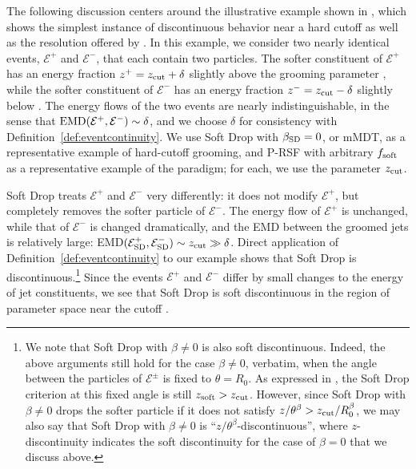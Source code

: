 The following discussion centers around the illustrative example shown in , which shows the simplest instance of discontinuous behavior near a hard cutoff as well as the resolution offered by \PIRANHA{}.
%
In this example, we consider two nearly identical events, \(\mathcal{E}^+\) and \(\mathcal{E}^-\), that each contain two particles.
%
The softer constituent of \(\mathcal E^+\) has an energy fraction \(z^+ =  z_{\rm cut} + \delta\) slightly above the grooming parameter \zcut, while the softer constituent of \(\mathcal E^-\) has an energy fraction \(z^- =z_{\rm cut} - \delta\) slightly below \zcut.
%
The energy flows of the two events are nearly indistinguishable, in the sense that \(
{\rm EMD}(\mathcal{E}^+, \mathcal{E}^-)\sim\delta
\),
and we choose \(\delta\) for consistency with Definition~\ref{def:eventcontinuity}.
%
We use Soft Drop with \(\beta_{\rm SD} = 0\), or mMDT, as a representative example of hard-cutoff grooming, and P-RSF with arbitrary \(f_{\rm soft}\) as a representative example of the \PIRANHA{} paradigm;
%
for each, we use the parameter \(z_{\rm cut}\).

Soft Drop treats \(\mathcal E^+\) and \(\mathcal E^-\) very differently:
%
it does not modify \(\mathcal E^+\), but completely removes the softer particle of \(\mathcal E^-\).
%
The energy flow of \(\mathcal E^+\) is unchanged, while that of \(\mathcal E^-\) is changed dramatically, and the EMD between the groomed jets is relatively large:
EMD\(
(\mathcal{E}^+_{\rm SD},
\mathcal{E}^-_{\rm SD})
\sim z_{\rm cut}
\gg \delta\).
%
Direct application of Definition~\ref{def:eventcontinuity} to our example shows that Soft Drop is discontinuous.\footnote{
We note that Soft Drop with \(\beta \neq 0\) is also soft discontinuous.
%
Indeed, the above arguments still hold for the case \(\beta \neq 0\), verbatim, when the angle between the particles of \(\mathcal E^\pm\) is fixed to \(\theta = R_0\).
%
As expressed in , the Soft Drop criterion at this fixed angle is still \(z_{\rm soft} > z_{\rm cut}\).
%
However, since Soft Drop with \(\beta \neq 0\) drops the softer particle if it does not satisfy \(z / \theta^{\beta} > z_{\rm cut}/ R_0^\beta\), we may also say that Soft Drop with \(\beta \neq 0\) is ``\(z / \theta^{\beta}\)-discontinuous'', where \(z\)-discontinuity indicates the soft discontinuity for the case of \(\beta = 0\) that we discuss above.
}
%
Since the events \(\mathcal E^+\) and \(\mathcal E^-\) differ by small changes to the energy of jet constituents, we see that Soft Drop is soft discontinuous in the region of parameter space near the cutoff \zcut.

